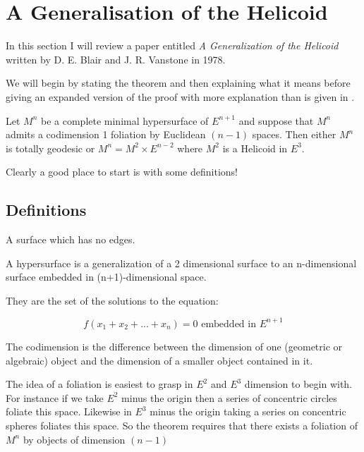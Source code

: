 \section{A Generalisation of the Helicoid}

In this section I will review \cite{BLR} a paper entitled \emph{A Generalization of the Helicoid} written by D. E. Blair and J. R. Vanstone in 1978.

We will begin by stating the theorem and then explaining what it means before giving an expanded version of the proof with more explanation than is given in \cite{BLR}.

\begin{nonumbertheorem}
Let $M^n$ be a complete minimal hypersurface of $E^{n+1}$ and suppose that $M^n$ admits a codimension 1 foliation by Euclidean $(n-1)$ spaces. Then either $M^n$ is totally geodesic or $M^n =  M^2 \times E^{n-2}$ where $M^2$ is a Helicoid in $E^3$.
\cite{BLR}
\end{nonumbertheorem}

Clearly a good place to start is with some definitions!

\subsection{Definitions}

\begin{definition}[Complete]
A surface which has no edges.
\end{definition}

\begin{definition}[Hypersurface]
A hypersurface is a generalization of a 2 dimensional surface to an n-dimensional surface embedded in (n+1)-dimensional space.

They are the set of the solutions to the equation:

\begin{displaymath}
f(x_1 + x_2 + ... + x_n) = 0 \mbox{\ \ \ \ embedded in } E^{n+1}
\end{displaymath}

\end{definition}

\begin{definition}[Codimension]
The codimension is the difference between the dimension of one (geometric or algebraic) object and the dimension of a smaller object contained in it.
\end{definition}

\begin{definition}[Foliation]
The idea of a foliation is easiest to grasp in $E^2$ and $E^3$ dimension to begin with.
For instance if we take $E^2$ minus the origin then a series of concentric circles foliate this space.
Likewise in $E^3$ minus the origin taking a series on concentric spheres foliates this space.
So the theorem requires that there exists a foliation of $M^n$ by objects of dimension $(n-1)$
\end{definition}

